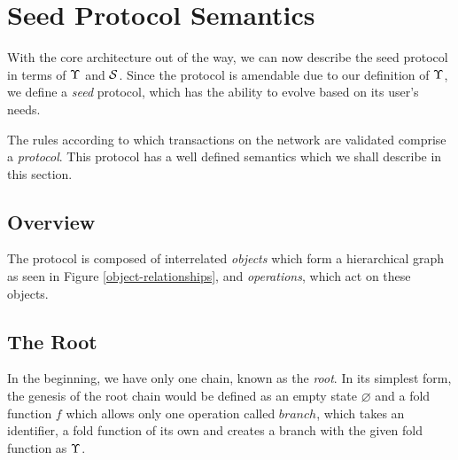 \section{Seed Protocol Semantics}
\label{sec:protocol-semantics}


With the core architecture out of the way, we can now describe the \oscoin{}
seed protocol in terms of $\Upsilon$ and $\mathcal{S}$. Since the protocol is amendable
due to our definition of $\Upsilon$, we define a \emph{seed} protocol, which has
the ability to evolve based on its user's needs.

The rules according to which transactions on the \oscoin{} network are
validated comprise a \emph{protocol}. This protocol has a well defined semantics
which we shall describe in this section.

\subsection{Overview} The \oscoin{} protocol is composed of interrelated
\emph{objects} which form a hierarchical graph as seen in Figure
\ref{object-relationships}, and \emph{operations}, which act on these objects.

\medskip

\begin{fig}
\centering
{}
\bigskip
{}
\end{fig}

\subsection{The Root}
In the beginning, we have only one chain, known as the \emph{root}. In its simplest
form, the genesis of the root chain would be defined as an empty state $\varnothing$
and a fold function $f$ which allows only one operation called $branch$, which takes
an identifier, a fold function of its own and creates a branch with the given
fold function as $\Upsilon$.

